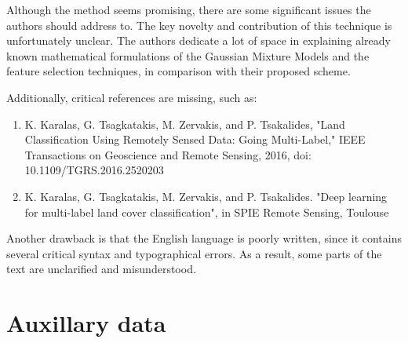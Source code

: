 \documentclass[a4paper,10pt,DIV=16]{scrartcl}
\begin{document}
\begin{revbox}
  Although the method seems promising, there are some significant issues the authors should address to. The key novelty and contribution of this technique is unfortunately unclear. The authors dedicate a lot of space in explaining already known mathematical formulations of the Gaussian Mixture Models and the feature selection techniques, in comparison with their proposed scheme.
  \begin{resbox}

  \end{resbox}
\end{revbox}

\begin{revbox}
  Additionally, critical references are missing, such as:
  \begin{enumerate}
  \item K. Karalas, G. Tsagkatakis, M. Zervakis, and P. Tsakalides, "Land Classification Using Remotely Sensed Data: Going Multi-Label," IEEE Transactions on Geoscience and Remote Sensing, 2016, doi: 10.1109/TGRS.2016.2520203
  \item K. Karalas, G. Tsagkatakis, M. Zervakis, and P. Tsakalides. "Deep learning for multi-label land cover classification", in SPIE Remote Sensing, Toulouse
  \end{enumerate}

  \begin{resbox}

  \end{resbox}
\end{revbox}

\begin{revbox}
  Another drawback is that the English language is poorly written, since it contains several critical syntax and typographical errors. As a result, some parts of the text are unclarified and misunderstood.
  \begin{resbox}

  \end{resbox}
\end{revbox}
 

\section{Auxillary data}
\label{sec:auxillary}
\end{document}
